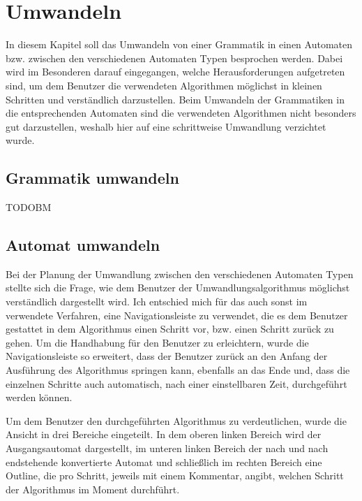 

\chapter{Umwandeln}\label{ConverTo}

In diesem Kapitel soll das Umwandeln von einer Grammatik in einen Automaten
bzw. zwischen den verschiedenen Automaten Typen besprochen werden. Dabei wird
im Besonderen darauf eingegangen, welche Herausforderungen aufgetreten sind, um
dem Benutzer die verwendeten Algorithmen möglichst in kleinen Schritten und
verständlich darzustellen. Beim Umwandeln der Grammatiken in die entsprechenden
Automaten sind die verwendeten Algorithmen nicht besonders gut darzustellen,
weshalb hier auf eine schrittweise Umwandlung verzichtet wurde.


\section{Grammatik umwandeln}

TODOBM


\section{Automat umwandeln}

Bei der Planung der Umwandlung zwischen den verschiedenen Automaten Typen
stellte sich die Frage, wie dem Benutzer der Umwandlungsalgorithmus möglichst
verständlich dargestellt wird. Ich entschied mich für das auch sonst im
\gtitool verwendete Verfahren, eine Navigationsleiste zu verwendet, die es dem
Benutzer gestattet in dem Algorithmus einen Schritt vor, bzw. einen Schritt
zurück zu gehen. Um die Handhabung für den Benutzer zu erleichtern, wurde die
Navigationsleiste so erweitert, dass der Benutzer zurück an den Anfang der
Ausführung des Algorithmus springen kann, ebenfalls an das Ende und, dass die
einzelnen Schritte auch automatisch, nach einer einstellbaren Zeit, durchgeführt
werden können.\vspace{10pt}

Um dem Benutzer den durchgeführten Algorithmus zu verdeutlichen, wurde die
Ansicht in drei Bereiche eingeteilt. In dem oberen linken Bereich wird der
Ausgangsautomat dargestellt, im unteren linken Bereich der nach und nach
endstehende konvertierte Automat und schließlich im rechten Bereich eine
Outline, die pro Schritt, jeweils mit einem Kommentar, angibt, welchen Schritt
der Algorithmus im Moment durchführt.\vspace{10pt}


